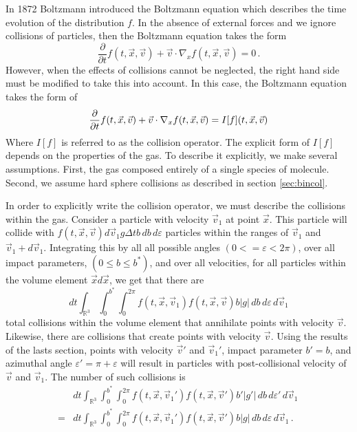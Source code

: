 \documentclass[12pt]{CSUNthesis}
\def\R{\mathbb{R}}
\def\R{\mathbb{R}}
\newcommand{\dydx}[2]{\frac{\partial{#1}}{\partial{#2}}}
\newcommand{\vecx}{\vec{x}}
\newcommand{\vecv}{\vec{v}}
\begin{document}
In 1872 Boltzmann \cite{Boltzmann1872} introduced the Boltzmann equation which describes the time evolution of the distribution $f$. In the absence of external forces and we ignore collisions of particles, then the Boltzmann equation takes the form
\begin{equation}
\label{eq:colless_boltzmann}
\dydx{}{t}f(t, \vecx, \vecv) + \vecv \cdot \nabla_x f(t, \vecx, \vecv) = 0\, .
\end{equation}
However, when the effects of collisions cannot be neglected, the right hand side must be modified to take this into account. In this case, the Boltzmann equation takes the form of
\begin{equation}
\label{eq:boltzmann}
\dydx{}{t}f(t, \vecx, \vecv) + \vecv \cdot \nabla_x f(t, \vecx, \vecv) = I[f](t,\vecx,\vecv)\, \\ 
\end{equation}
Where $I[f]$ is referred to as the collision operator. The explicit form of $I[f]$ depends on the properties of the gas. To describe it explicitly, we make several assumptions. First, the gas composed entirely of a single species of molecule. Second, we assume hard sphere collisions as described in section \ref{sec:bincol}. 

In order to explicitly write the collision operator, we must describe the collisions within the gas. Consider a particle with velocity $\vecv_1$ at point $\vecx$. This particle will collide with $f(t,\vecx, \vecv)d\vecv_1 g \Delta t b \, db \, d\varepsilon$ particles within the ranges of $\vecv_1$ and $\vecv_1 + d\vecv_1$. Integrating this by all all possible angles $(0 <= \varepsilon < 2 \pi)$, over all impact parameters, $(0 \leq b \leq b^*)$, and over all velocities, for all particles within the volume element $\vecx d\vecx$, we get that there are 
\begin{equation}
\label{eq:depletion}
dt \int_{\R^3} \int_0^{b^*} \int_0^{2\pi} f(t, \vecx, \vecv_1) f(t, \vecx, \vecv) b |g|\,  db \, d\varepsilon\, d\vecv_1 
\end{equation}
total collisions within the volume element that annihilate points with velocity $\vecv$. Likewise, there are collisions that create points with velocity $\vecv$. Using the results of the lasts section, points with velocity $\vecv'$ and $\vecv_1'$, impact parameter $b'=b$, and azimuthal angle $\varepsilon' = \pi + \varepsilon$ will result in particles with post-collisional velocity of $\vecv$ and $\vecv_1$. The number of such collisions is
\begin{equation}
\label{eq:restitution}
\begin{split}
&dt \int_{\R^3} \int_0^{b^*} \int_0^{2\pi} f(t, \vecx, \vecv_1') f(t, \vecx, \vecv') b' |g'|\,  db \, d\varepsilon'\, d\vecv_1 \,  \\
=&dt \int_{\R^3} \int_0^{b^*} \int_0^{2\pi} f(t, \vecx, \vecv_1') f(t, \vecx, \vecv') b |g|\,  db \, d\varepsilon\, d\vecv_1 \, .
\end{split}
\end{equation}
\end{document}
